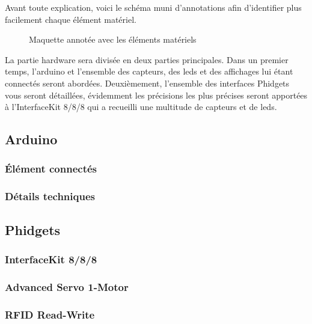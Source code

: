 Avant toute explication, voici le schéma muni d’annotations afin d’identifier plus facilement chaque élément matériel.\\

\begin{figure}[H]
    \begin{center}

        \caption{Maquette annotée avec les éléments matériels}
    \end{center}
\end{figure}

La partie hardware sera divisée en deux parties principales. Dans un premier temps, l’arduino et l’ensemble des capteurs, des leds et des affichages lui étant connectés seront abordées. Deuxièmement, l’ensemble des interfaces Phidgets vous seront détaillées, évidemment les précisions les plus précises seront apportées à l’InterfaceKit 8/8/8 qui a recueilli une multitude de capteurs et de leds.\\

\subsection{Arduino}
\subsubsection{Élément connectés}
\subsubsection{Détails techniques}

\subsection{Phidgets}
\subsubsection{InterfaceKit 8/8/8}
\subsubsection{Advanced Servo 1-Motor}
\subsubsection{RFID Read-Write}


